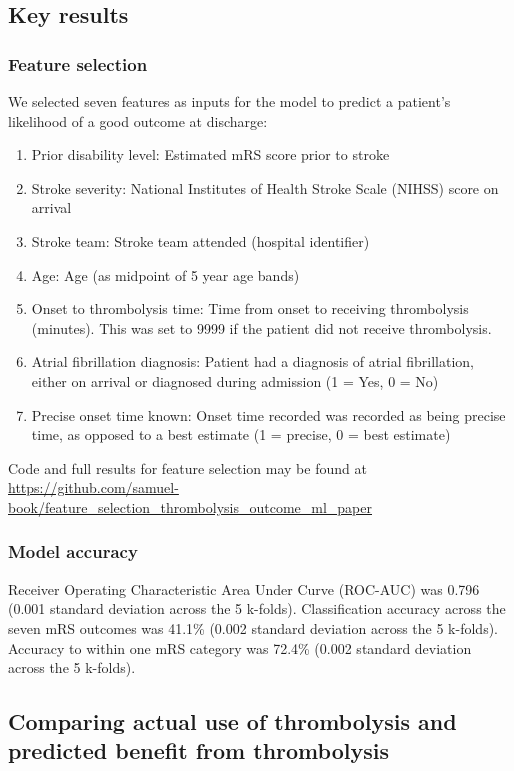 \subsection{Key results}

\subsubsection{Feature selection}

We selected seven features as inputs for the model to predict a patient's likelihood of a good outcome at discharge:

\begin{enumerate}
    \item Prior disability level: Estimated mRS score prior to stroke
    \item Stroke severity: National Institutes of Health Stroke Scale (NIHSS) score on arrival
    \item Stroke team: Stroke team attended (hospital identifier)
    \item Age: Age (as midpoint of 5 year age bands)
    \item Onset to thrombolysis time: Time from onset to receiving thrombolysis (minutes). This was set to 9999 if the patient did not receive thrombolysis.
    \item Atrial fibrillation diagnosis: Patient had a diagnosis of atrial fibrillation, either on arrival or diagnosed during admission (1 = Yes, 0 = No)
    \item Precise onset time known: Onset time recorded was recorded as being precise time, as opposed to a best estimate (1 = precise, 0 = best estimate)
\end{enumerate}

Code and full results for feature selection may be found at \url{https://github.com/samuel-book/feature_selection_thrombolysis_outcome_ml_paper}

\subsubsection{Model accuracy}

Receiver Operating Characteristic Area Under Curve (ROC-AUC) was 0.796 (0.001 standard deviation across the 5 k-folds). Classification accuracy across the seven mRS outcomes was 41.1\% (0.002 standard deviation across the 5 k-folds). Accuracy to within one mRS category was 72.4\% (0.002 standard deviation across the 5 k-folds).  

\subsection{Comparing actual use of thrombolysis and predicted benefit from thrombolysis}

